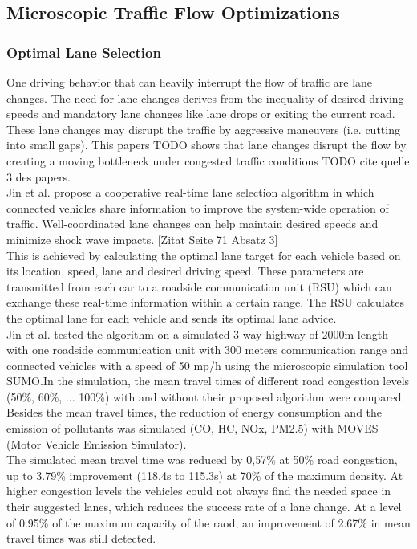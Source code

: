 \documentclass{sig-alternate}
\begin{document}
\subsection{Microscopic Traffic Flow Optimizations}
\subsubsection{Optimal Lane Selection}
One driving behavior that can heavily interrupt the flow of traffic are lane changes. The need for lane changes derives from the inequality of desired driving speeds and mandatory lane changes like lane drops or exiting the current road. These lane changes may disrupt the traffic by aggressive maneuvers (i.e. cutting into small gaps). This papers TODO shows that lane changes disrupt the flow by creating a moving bottleneck under congested traffic conditions TODO cite quelle 3 des papers. \\
Jin et al.\cite{6856515} propose a cooperative real-time lane selection algorithm in which connected vehicles share information to improve the system-wide operation of traffic. Well-coordinated lane changes can help maintain desired speeds and minimize shock wave impacts.  [Zitat Seite 71 Absatz 3] \\
This is achieved by calculating the optimal lane target for each vehicle based on its location, speed, lane and desired driving speed. These parameters are transmitted from each car to a roadside communication unit (RSU) which can exchange these real-time information within a certain range. The RSU calculates the optimal lane for each vehicle and sends its optimal lane advice. \\
Jin et al.\cite{6856515} tested the algorithm on a simulated 3-way highway of 2000m length with one roadside communication unit with 300 meters communication range and connected vehicles with a speed of 50 mp/h using the microscopic simulation tool SUMO\cite{sumo}.In the simulation, the mean travel times of different road congestion levels (50\%, 60\%, ... 100\%) with and without their proposed algorithm were compared. Besides the mean travel times, the reduction of energy consumption and the emission of pollutants was simulated (CO, HC, NOx, PM2.5) with MOVES\cite{simulator2010user} (Motor Vehicle Emission Simulator).\\
The simulated mean travel time was reduced by 0,57\% at 50\% road congestion, up to 3.79\% improvement (118.4s to 115.3s) at 70\% of the maximum density. At higher congestion levels the vehicles could not always find the needed space in their suggested lanes, which reduces the success rate of a lane change. At a level of 0.95\% of the maximum capacity of the raod, an improvement of 2.67\% in mean travel times was still detected. \\
\end{document}

